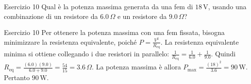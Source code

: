 \documentclass[a4paper]{article}
\begin{document}
\begin{snippetexercise}{Esercizio 10}
    Qual è la potenza massima generata da una fem di \(18\,\mathrm{V}\), usando
    una combinazione di un resistore da \(6.0\,\Omega\) e un resistore da
    \(9.0\,\Omega\)?
\end{snippetexercise}
\begin{snippetsolution}{Esercizio 10}
    Per ottenere la potenza massima con una fem fissata, bisogna minimizzare
    la resistenza equivalente, poiché
    \(P = \frac{V^2}{R_{\mathrm{eq}}}.\)
    La resistenza equivalente minima si ottiene collegando i due resistori in
    parallelo:
    \(\frac{1}{R_{\mathrm{eq}}} = \frac{1}{6.0} + \frac{1}{9.0}.\)
    Quindi
    \(R_{\mathrm{eq}} = \frac{(6.0)(9.0)}{6.0 + 9.0} = \frac{54}{15} = 3.6\,\Omega.\)
    La potenza massima è allora
    \(P_{\max} = \frac{(18)^2}{3.6} = 90\,\mathrm{W}.\)
    Pertanto
    \(\boxed{90\,\mathrm{W}}.\)
\end{snippetsolution}
\pagebreak
\end{document}
